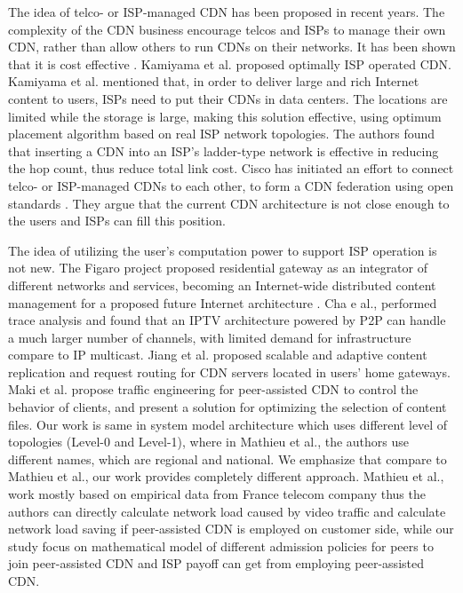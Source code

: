 \documentclass[paper]{ieice}
\begin{document}
The idea of telco- or ISP-managed CDN has been proposed in recent years.  
The complexity of the CDN business encourage telcos and ISPs to manage their own CDN, rather than allow others to run CDNs on their networks.  
It has been shown that it is cost effective \cite{federation}\cite{norton2011internet}. 
Kamiyama et al. \cite{NoriakiKAMIYAMA2013} proposed optimally ISP operated CDN.
Kamiyama et al. mentioned that, in order to deliver large and rich Internet content to users, ISPs need to put their CDNs in data centers.  
The locations are limited while the storage is large, making this solution effective, using optimum placement algorithm based on real ISP network topologies.  
The authors found that inserting a CDN into an ISP's ladder-type network is effective in reducing the hop count, thus reduce total link cost.  
Cisco has initiated an effort to connect telco- or ISP-managed CDNs to each other, to form a CDN federation \cite{federation} using open standards \cite{cdni}.  
They argue that the current CDN architecture is not close enough to the users and ISPs can fill this position.

The idea of utilizing the user's computation power to support ISP operation is not new.  The Figaro project \cite{figaro} proposed residential gateway as an integrator of different networks and services, becoming an Internet-wide distributed content management for a proposed future Internet architecture \cite{figaro}.  
Cha e al.,\cite{Cha:2008:NTP:1855641.1855646} performed trace analysis and found that an IPTV architecture powered by P2P can handle a much larger number of channels, with limited demand for infrastructure compare to IP multicast.  
Jiang et al. \cite{Jiang:2012:OMD:2413176.2413193} proposed scalable and adaptive content replication and request routing for CDN servers located in users' home gateways.  
Maki et al.\cite{NaoyaMAKI2012} propose traffic engineering for peer-assisted CDN to control the behavior of clients, and present a solution for optimizing the selection of content files.
Our work is same in system model architecture which uses different level of topologies  (Level-0 and Level-1), where in Mathieu et al., \cite{6249305} the authors use different names, which are regional and national. 
We emphasize that compare to  Mathieu et al., \cite{6249305} our work provides completely different approach.
Mathieu et al., \cite{6249305} work mostly based on empirical data from France telecom company thus the authors can directly calculate network load caused by video traffic and calculate network load saving if peer-assisted CDN is employed on customer side,  while our study focus on mathematical model of different admission policies for peers to join peer-assisted CDN and ISP payoff can get from employing peer-assisted CDN.
\end{document}
